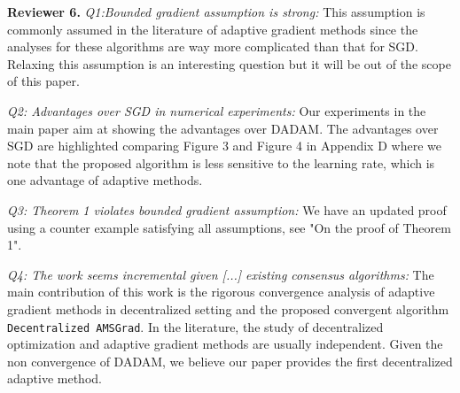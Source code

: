 \documentclass{article}
\begin{document}
\textbf{Reviewer 6.}
\textit{Q1:Bounded gradient assumption is strong:}
This assumption is commonly assumed in the literature of adaptive gradient methods since the analyses for these algorithms are way more complicated than that for SGD. 
Relaxing this assumption is an interesting question but it will be out of the scope of this paper.\vspace{-5pt}

\textit{Q2: Advantages over SGD in numerical experiments:}
Our experiments in the main paper aim at showing the advantages over DADAM. 
The advantages over SGD are highlighted comparing Figure 3 and Figure 4 in Appendix D where we note that the proposed algorithm is less sensitive to the learning rate, which is one advantage of adaptive methods.\vspace{-5pt}

\textit{Q3: Theorem 1 violates bounded gradient assumption:} We have an updated proof using a counter example satisfying all assumptions, see "On the proof of Theorem 1".\vspace{-5pt}

\textit{Q4: The work seems incremental given [...] existing consensus algorithms:}
The main contribution of this work is the rigorous convergence analysis of adaptive gradient methods in decentralized setting and the proposed convergent algorithm \texttt{Decentralized AMSGrad}. 
In the literature, the study of decentralized optimization and adaptive gradient methods are usually independent. 
Given the non convergence of DADAM, we believe our paper provides the first decentralized adaptive method.


\end{document}
